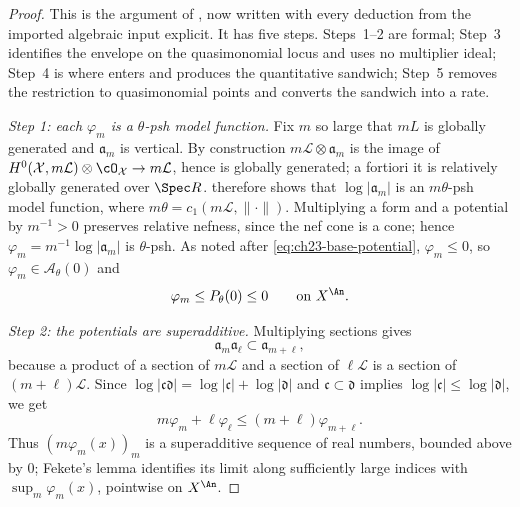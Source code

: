 \begin{proof}
This is the argument of \cite[Theorem~8.5]{BFJ16}, now written with every
deduction from the imported algebraic input explicit.  It has five steps.
Steps~1--2 are formal; Step~3 identifies the envelope on the quasimonomial
locus and uses no multiplier ideal; Step~4 is where
 enters and produces the
quantitative sandwich; Step~5 removes the restriction to quasimonomial
points and converts the sandwich into a rate.

\emph{Step 1: each \(\varphi_m\) is a \(\theta\)-psh model function.}
Fix \(m\) so large that \(mL\) is globally generated and
\(\mathfrak a_m\) is vertical.  By construction
\(m\mathcal L\otimes\mathfrak a_m\) is the image of
\(H^0(\mathcal X,m\mathcal L)\otimes\cO_{\mathcal X}\to m\mathcal L\), hence
is globally generated; a fortiori it is relatively globally generated over
\(\Spec R\).   therefore shows that
\(\log|\mathfrak a_m|\) is an \(m\theta\)-psh model function, where
\(m\theta=c_1(m\mathcal L,\|\cdot\|)\).  Multiplying a form and a potential
by \(m^{-1}>0\) preserves relative nefness, since the nef cone is a cone;
hence \(\varphi_m=m^{-1}\log|\mathfrak a_m|\) is \(\theta\)-psh.  As noted
after \eqref{eq:ch23-base-potential}, \(\varphi_m\leq0\), so
\(\varphi_m\in\mathcal A_\theta(0)\) and
\begin{equation}\label{eq:ch23-varphi-m-below-envelope}
 \varphi_m\leq P_\theta(0)\leq 0
 \qquad\text{on }X^{\An}.
\end{equation}

\emph{Step 2: the potentials are superadditive.}
Multiplying sections gives
\begin{equation}\label{eq:ch23-graded-base-ideals}
                \mathfrak a_m\mathfrak a_\ell
                \subset\mathfrak a_{m+\ell},
\end{equation}
because a product of a section of \(m\mathcal L\) and a section of
\(\ell\mathcal L\) is a section of \((m+\ell)\mathcal L\).  Since
\(\log|\mathfrak c\mathfrak d|=\log|\mathfrak c|+\log|\mathfrak d|\) and
\(\mathfrak c\subset\mathfrak d\) implies
\(\log|\mathfrak c|\leq\log|\mathfrak d|\), we get
\begin{equation}\label{eq:ch23-superadditive-potentials}
             m\varphi_m+\ell\varphi_\ell
             \leq(m+\ell)\varphi_{m+\ell}.
\end{equation}
Thus \((m\varphi_m(x))_m\) is a superadditive sequence of real numbers,
bounded above by \(0\); Fekete's lemma identifies its limit along
sufficiently large indices with \(\sup_m\varphi_m(x)\), pointwise on
\(X^{\An}\).


\end{proof}

